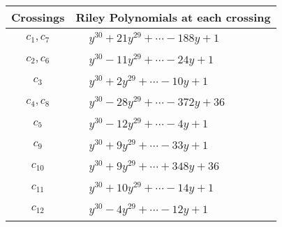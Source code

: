 \documentclass[1p]{elsarticle_modified}
\theoremstyle{definition}
\begin{document}
\begin{tabular}{m{50pt}|m{274pt}}
Crossings & \hspace{64pt}Riley Polynomials at each crossing \\
\hline $$\begin{aligned}c_{1},c_{7}\end{aligned}$$&$\begin{aligned}
&y^{30}+21 y^{29}+\cdots-188 y+1
\end{aligned}$\\
\hline $$\begin{aligned}c_{2},c_{6}\end{aligned}$$&$\begin{aligned}
&y^{30}-11 y^{29}+\cdots-24 y+1
\end{aligned}$\\
\hline $$\begin{aligned}c_{3}\end{aligned}$$&$\begin{aligned}
&y^{30}+2 y^{29}+\cdots-10 y+1
\end{aligned}$\\
\hline $$\begin{aligned}c_{4},c_{8}\end{aligned}$$&$\begin{aligned}
&y^{30}-28 y^{29}+\cdots-372 y+36
\end{aligned}$\\
\hline $$\begin{aligned}c_{5}\end{aligned}$$&$\begin{aligned}
&y^{30}-12 y^{29}+\cdots-4 y+1
\end{aligned}$\\
\hline $$\begin{aligned}c_{9}\end{aligned}$$&$\begin{aligned}
&y^{30}+9 y^{29}+\cdots-33 y+1
\end{aligned}$\\
\hline $$\begin{aligned}c_{10}\end{aligned}$$&$\begin{aligned}
&y^{30}+9 y^{29}+\cdots+348 y+36
\end{aligned}$\\
\hline $$\begin{aligned}c_{11}\end{aligned}$$&$\begin{aligned}
&y^{30}+10 y^{29}+\cdots-14 y+1
\end{aligned}$\\
\hline $$\begin{aligned}c_{12}\end{aligned}$$&$\begin{aligned}
&y^{30}-4 y^{29}+\cdots-12 y+1
\end{aligned}$\\
\hline
\end{tabular}\\~\\
\end{document}
